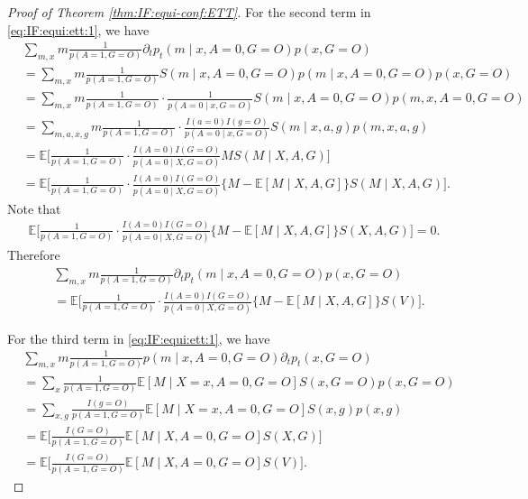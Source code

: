 \documentclass[10pt]{article}
\newcommand{\E}{\mathbb{E}}
\begin{document}
\begin{proof}[Proof of Theorem \ref{thm:IF:equi-conf:ETT}]
For the second term in \eqref{eq:IF:equi:ett:1}, we have
\begin{align*}
&\sum_{m,x} m \frac{1}{p(A=1,G=O)}\partial_t p_t(m\mid x,A=0,G=O)p(x,G=O)\\
&=\sum_{m,x} m \frac{1}{p(A=1,G=O)} S(m\mid x,A=0,G=O)p(m\mid x,A=0,G=O)p(x,G=O)\\
&=\sum_{m,x} m \frac{1}{p(A=1,G=O)}\cdot\frac{1}{p(A=0\mid x,G=O)} S(m\mid x,A=0,G=O)p(m,x,A=0,G=O)\\
&=\sum_{m,a,x,g} m \frac{1}{p(A=1,G=O)}\cdot\frac{I(a=0)I(g=O)}{p(A=0\mid x,G=O)} S(m\mid x,a,g)p(m,x,a,g)\\
&=\E\Big[\frac{1}{p(A=1,G=O)}\cdot\frac{I(A=0)I(G=O)}{p(A=0\mid X,G=O)}M S(M\mid X,A,G) \Big]\\
&=\E\Big[\frac{1}{p(A=1,G=O)}\cdot\frac{I(A=0)I(G=O)}{p(A=0\mid X,G=O)}\{M-\E[M\mid X,A,G]\} S(M\mid X,A,G) \Big].
\end{align*}
Note that
\begin{align*}
\E\Big[\frac{1}{p(A=1,G=O)}\cdot\frac{I(A=0)I(G=O)}{p(A=0\mid X,G=O)}\{M-\E[M\mid X,A,G]\} S(X,A,G) \Big]=0.	
\end{align*}
Therefore
\begin{equation}
\label{eq:IF:equi:ett:3}
\begin{aligned}
&\sum_{m,x} m \frac{1}{p(A=1,G=O)}\partial_t p_t(m\mid x,A=0,G=O)p(x,G=O)\\
&=\E\Big[\frac{1}{p(A=1,G=O)}\cdot\frac{I(A=0)I(G=O)}{p(A=0\mid X,G=O)}\{M-\E[M\mid X,A,G]\} S(V) \Big].
\end{aligned}
\end{equation}

For the third term in \eqref{eq:IF:equi:ett:1}, we have
\begin{equation}
\label{eq:IF:equi:ett:4}
\begin{aligned}
&\sum_{m,x} m \frac{1}{p(A=1,G=O)}p(m\mid x,A=0,G=O)\partial_t p_t(x,G=O)\\
&=\sum_{x}\frac{1}{p(A=1,G=O)}\E[M\mid X=x,A=0,G=O] S(x,G=O)p(x,G=O)\\
&=\sum_{x,g}\frac{I(g=O)}{p(A=1,G=O)}\E[M\mid X=x,A=0,G=O] S(x,g)p(x,g)\\
&=\E\Big[\frac{I(G=O)}{p(A=1,G=O)}\E[M\mid X,A=0,G=O] S(X,G)\Big]\\
&=\E\Big[\frac{I(G=O)}{p(A=1,G=O)}\E[M\mid X,A=0,G=O] S(V)\Big].
\end{aligned}
\end{equation}


\end{proof}
\end{document}
